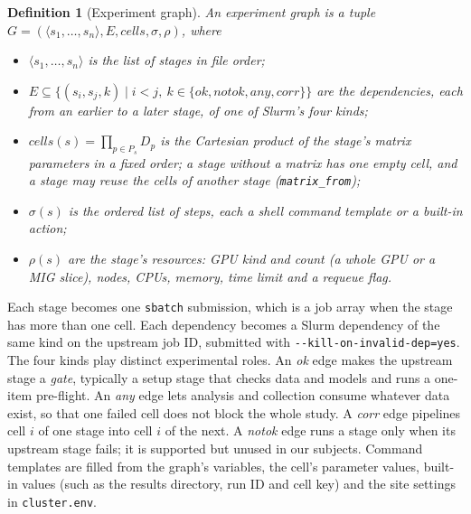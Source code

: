 \documentclass[pdflatex,sn-mathphys-num]{sn-jnl}
\theoremstyle{thmstyletwo}%
\theoremstyle{thmstylethree}%
\newtheorem{definition}{Definition}%
\newcommand{\code}[1]{\texttt{#1}}
\begin{document}
\begin{definition}[Experiment graph]\label{def:graph}
An experiment graph is a tuple
$G=(\langle s_1,\dots,s_n\rangle, E, \mathit{cells}, \sigma, \rho)$, where
\begin{itemize}[leftmargin=1.4em, itemsep=1pt]
\item $\langle s_1,\dots,s_n\rangle$ is the list of \emph{stages} in file order;
\item $E\subseteq \{(s_i,s_j,k) \mid i<j,\ k\in\{\mathit{ok},\mathit{notok},\mathit{any},\mathit{corr}\}\}$ are the \emph{dependencies}, each from an earlier to a later stage, of one of Slurm's four kinds;
\item $\mathit{cells}(s)=\prod_{p\in P_s} D_p$ is the Cartesian product of the stage's \emph{matrix} parameters in a fixed order; a stage without a matrix has one empty cell, and a stage may reuse the cells of another stage (\code{matrix\_from});
\item $\sigma(s)$ is the ordered list of \emph{steps}, each a shell command template or a built-in action;
\item $\rho(s)$ are the stage's \emph{resources}: GPU kind and count (a whole GPU or a MIG slice), nodes, CPUs, memory, time limit and a requeue flag.
\end{itemize}
\end{definition}

Each stage becomes one \code{sbatch} submission, which is a job array when the stage has more than one cell. Each dependency becomes a Slurm dependency of the same kind on the upstream job ID, submitted with \code{-{}-kill-on-invalid-dep=yes}. The four kinds play distinct experimental roles. An \emph{ok} edge makes the upstream stage a \emph{gate}, typically a setup stage that checks data and models and runs a one-item pre-flight. An \emph{any} edge lets analysis and collection consume whatever data exist, so that one failed cell does not block the whole study. A \emph{corr} edge pipelines cell $i$ of one stage into cell $i$ of the next. A \emph{notok} edge runs a stage only when its upstream stage fails; it is supported but unused in our subjects. Command templates are filled from the graph's variables, the cell's parameter values, built-in values (such as the results directory, run ID and cell key) and the site settings in \code{cluster.env}.
\end{document}

